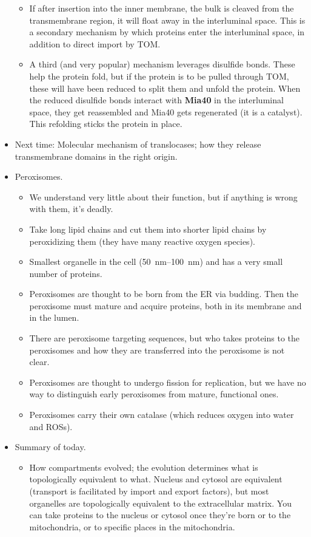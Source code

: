\documentclass[../notes.tex]{subfiles}
\begin{document}
\begin{itemize}
\begin{itemize}
        \item If after insertion into the inner membrane, the bulk is cleaved from the transmembrane region, it will float away in the interluminal space. This is a secondary mechanism by which proteins enter the interluminal space, in addition to direct import by TOM.
        \item A third (and very popular) mechanism leverages disulfide bonds. These help the protein fold, but if the protein is to be pulled through TOM, these will have been reduced to split them and unfold the protein. When the reduced disulfide bonds interact with \textbf{Mia40} in the interluminal space, they get reassembled and Mia40 gets regenerated (it is a catalyst). This refolding sticks the protein in place.
    \end{itemize}
    \item Next time: Molecular mechanism of translocases; how they release transmembrane domains in the right origin.
    \item Peroxisomes.
    \begin{itemize}
        \item We understand very little about their function, but if anything is wrong with them, it's deadly.
        \item Take long lipid chains and cut them into shorter lipid chains by peroxidizing them (they have many reactive oxygen species).
        \item Smallest organelle in the cell (\SIrange{50}{100}{\nano\meter}) and has a very small number of proteins.
        \item Peroxisomes are thought to be born from the ER via budding. Then the peroxisome must mature and acquire proteins, both in its membrane and in the lumen.
        \item There are peroxisome targeting sequences, but who takes proteins to the peroxisomes and how they are transferred into the peroxisome is not clear.
        \item Peroxisomes are thought to undergo fission for replication, but we have no way to distinguish early peroxisomes from mature, functional ones.
        \item Peroxisomes carry their own catalase (which reduces oxygen into water and ROSs).
    \end{itemize}
    \item Summary of today.
    \begin{itemize}
        \item How compartments evolved; the evolution determines what is topologically equivalent to what. Nucleus and cytosol are equivalent (transport is facilitated by import and export factors), but most organelles are topologically equivalent to the extracellular matrix. You can take proteins to the nucleus or cytosol once they're born or to the mitochondria, or to specific places in the mitochondria.

\end{itemize}
\end{itemize}
\end{document}
